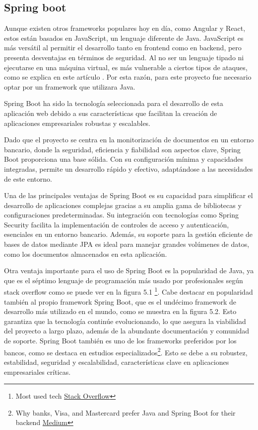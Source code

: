 \documentclass[draft]{scrbook}
\begin{document}
\subsection{ Spring boot }
Aunque existen otros frameworks populares hoy en día, como Angular y React, estos están basados en JavaScript, un lenguaje diferente de Java. JavaScript es más versátil al permitir el desarrollo tanto en frontend como en backend, pero presenta desventajas en términos de seguridad. Al no ser un lenguaje tipado ni ejecutarse en una máquina virtual, es más vulnerable a ciertos tipos de ataques, como se explica en este artículo \cite{java-vs-javascript}. Por esta razón, para este proyecto fue necesario optar por un framework que utilizara Java.

Spring Boot ha sido la tecnología seleccionada para el desarrollo de esta aplicación web debido a sus características que facilitan la creación de aplicaciones empresariales robustas y escalables. 

Dado que el proyecto se centra en la monitorización de documentos en un entorno bancario, donde la seguridad, eficiencia y fiabilidad son aspectos clave, Spring Boot proporciona una base sólida. Con su configuración mínima y capacidades integradas, permite un desarrollo rápido y efectivo, adaptándose a las necesidades de este entorno.

Una de las principales ventajas de Spring Boot es su capacidad para simplificar el desarrollo de aplicaciones complejas gracias a su amplia gama de bibliotecas y configuraciones predeterminadas. Su integración con tecnologías como Spring Security facilita la implementación de controles de acceso y autenticación, esenciales en un entorno bancario. Además, su soporte para la gestión eficiente de bases de datos mediante JPA es ideal para manejar grandes volúmenes de datos, como los documentos almacenados en esta aplicación.

Otra ventaja importante para el uso de Spring Boot es la popularidad de Java, ya que es el séptimo lenguaje de programación más usado por profesionales según stack overflow como se puede ver en la figura 5.1 \footnote{ Most used tech \href{https://survey.stackoverflow.co/2024/technology\#most-popular-technologies-language}{Stack Overflow}}. Cabe destacar en popularidad también al propio framework Spring Boot, que es el undécimo framework de desarrollo más utilizado en el mundo, como se muestra en la figura 5.2. Esto garantiza que la tecnología continúe evolucionando, lo que asegura la viabilidad del proyecto a largo plazo, además de la abundante documentación y comunidad de soporte. Spring Boot también es uno de los frameworks preferidos por los bancos, como se destaca en estudios especializados\footnote{Why banks, Visa, and Mastercard prefer Java and Spring Boot for their backend \href{https://medium.com/@YodgorbekKomilo/why-banks-visa-and-mastercard-prefer-java-and-spring-boot-for-their-backend-and-server-3db88940f594}{Medium}}. Esto se debe a su robustez, estabilidad, seguridad y escalabilidad, características clave en aplicaciones empresariales críticas.
\end{document}
